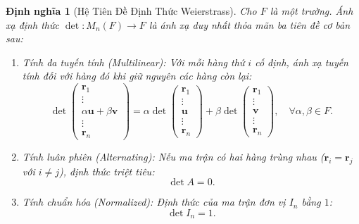 \documentclass{article}
\newtheorem{dinhnghia}{Định nghĩa}
\begin{document}
\begin{dinhnghia}[Hệ Tiên Đề Định Thức Weierstrass]
Cho $F$ là một trường. Ánh xạ định thức $\det: M_n(F) \to F$ là ánh xạ duy nhất thỏa mãn ba tiên đề cơ bản sau:
\begin{enumerate}
    \item \emph{Tính đa tuyến tính (Multilinear):} Với mỗi hàng thứ $i$ cố định, ánh xạ tuyến tính đối với hàng đó khi giữ nguyên các hàng còn lại:
    \begin{equation}
        \det \begin{pmatrix} \mathbf{r}_1 \\ \vdots \\ \alpha \mathbf{u} + \beta \mathbf{v} \\ \vdots \\ \mathbf{r}_n \end{pmatrix} = \alpha \det \begin{pmatrix} \mathbf{r}_1 \\ \vdots \\ \mathbf{u} \\ \vdots \\ \mathbf{r}_n \end{pmatrix} + \beta \det \begin{pmatrix} \mathbf{r}_1 \\ \vdots \\ \mathbf{v} \\ \vdots \\ \mathbf{r}_n \end{pmatrix}, \quad \forall \alpha, \beta \in F.
    \end{equation}
    \item \emph{Tính luân phiên (Alternating):} Nếu ma trận có hai hàng trùng nhau ($\mathbf{r}_i = \mathbf{r}_j$ với $i \ne j$), định thức triệt tiêu:
    \begin{equation}
        \det A = 0.
    \end{equation}
    \item \emph{Tính chuẩn hóa (Normalized):} Định thức của ma trận đơn vị $I_n$ bằng $1$:
    \begin{equation}
        \det I_n = 1.
    \end{equation}
\end{enumerate}
\end{dinhnghia}
\end{document}
